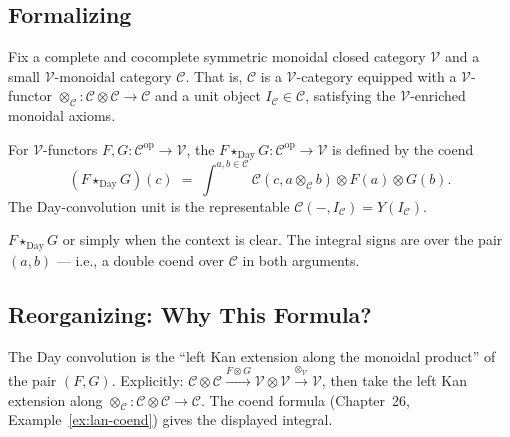 \subsection{Formalizing}

Fix a complete and cocomplete symmetric monoidal closed category $\mathcal{V}$
and a small $\mathcal{V}$-monoidal category $\mathcal{C}$. That is,
$\mathcal{C}$ is a $\mathcal{V}$-category equipped with a $\mathcal{V}$-functor
$\otimes_\mathcal{C} : \mathcal{C} \otimes \mathcal{C} \to \mathcal{C}$ and a
unit object $I_\mathcal{C} \in \mathcal{C}$, satisfying the $\mathcal{V}$-enriched
monoidal axioms.

\begin{definition}
\label{def:day-convolution}
For $\mathcal{V}$-functors $F, G : \mathcal{C}^{\mathrm{op}} \to \mathcal{V}$,
the  $F \star_{\mathrm{Day}} G : \mathcal{C}^{\mathrm{op}}
\to \mathcal{V}$ is defined by the coend
\begin{equation*}
  (F \star_{\mathrm{Day}} G)(c) \;=\; \int^{a, b \in \mathcal{C}}
  \mathcal{C}(c, a \otimes_\mathcal{C} b) \otimes F(a) \otimes G(b).
\end{equation*}
The Day-convolution unit is the representable $\mathcal{C}(-, I_\mathcal{C})
= Y(I_\mathcal{C})$.
\end{definition}

\begin{howtosay}
$F \star_{\mathrm{Day}} G$  or simply
 when the context is clear. The integral signs are over
the pair $(a, b)$ — i.e., a double coend over $\mathcal{C}$ in both arguments.
\end{howtosay}

\subsection{Reorganizing: Why This Formula?}

\begin{remark}
The Day convolution is the ``left Kan extension along the monoidal product''
of the pair $(F, G)$. Explicitly: $\mathcal{C} \otimes \mathcal{C}
\xrightarrow{F \otimes G} \mathcal{V} \otimes \mathcal{V} \xrightarrow{\otimes_\mathcal{V}}
\mathcal{V}$, then take the left Kan extension along $\otimes_\mathcal{C} :
\mathcal{C} \otimes \mathcal{C} \to \mathcal{C}$. The coend formula
(Chapter~26, Example~\ref{ex:lan-coend}) gives the displayed integral.
\end{remark}


